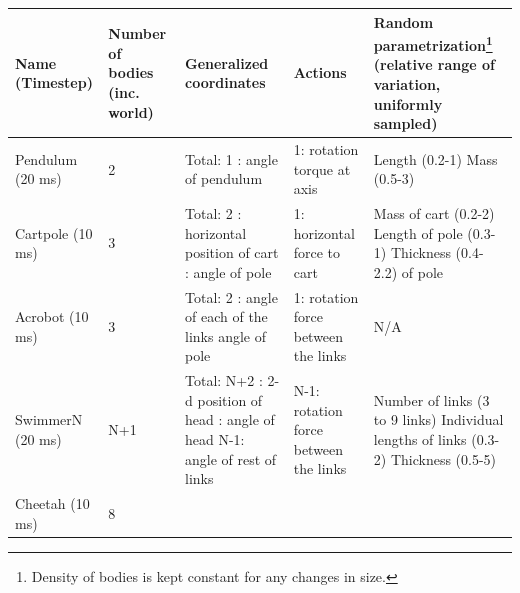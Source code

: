 \begin{minipage}{\columnwidth}
\vskip 0.15in
\begin{center}
\begin{small}
\renewcommand{\arraystretch}{1.5}
\begin{tabular}{p{15mm}p{14mm}p{36mm}p{32mm}p{45mm}}
\toprule
 Name \newline (Timestep) & Number \newline of bodies \newline (inc. world) & Generalized \newline coordinates & Actions & Random parametrization\footnote{Density of bodies is kept constant for any changes in size.}  \newline (relative range of variation, \newline uniformly sampled) \\
\midrule
Pendulum \newline (20 ms)  & 2  
& {Total: 1 
\newline 1: angle of pendulum}
& {1: rotation torque at axis}
& Length (0.2-1)
\newline Mass (0.5-3)
\\
Cartpole \newline (10 ms)  & 3
& {Total: 2 
\newline 1: horizontal position of cart
\newline 1: angle of pole}
& {1: horizontal force to cart}
& Mass of cart (0.2-2)
\newline Length of pole (0.3-1) 
\newline Thickness (0.4-2.2) of pole
\\
Acrobot \newline (10 ms)  & 3 
& {Total: 2 
\newline 2: angle of each of the links 
\newline angle of pole}
& {1: rotation force between the links}
& N/A
\\
SwimmerN  \newline (20 ms) & N+1 
& {Total: N+2
\newline 2: 2-d position of head 
\newline 1: angle of head
\newline N-1: angle of rest of links} 
& {N-1: rotation force between the links}
& Number of links (3 to 9 links)
\newline Individual lengths of links (0.3-2)
\newline Thickness (0.5-5)
\\
Cheetah \newline (10 ms)  & 8 

\end{tabular}
\end{small}
\end{center}
\end{minipage}
